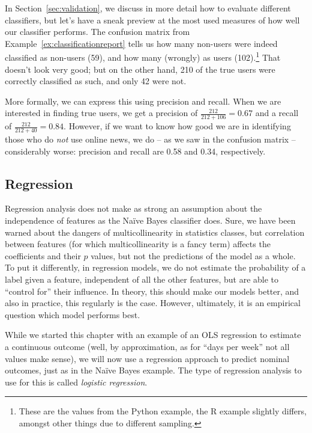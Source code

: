 In Section~\ref{sec:validation}, we discuss in more detail how to
evaluate different classifiers, but let's have a sneak preview at the most used
measures of how well our classifier performs.
The confusion matrix from Example~\ref{ex:classificationreport} tells us how many non-users were indeed
classified as non-users (59), and how many (wrongly) as users
(102).\footnote{These are the values from the Python example, the R
  example slightly differs, amongst other things due to different
  sampling.} That doesn't look very good; but on the other hand, 210
of the true users were correctly classified as such, and only 42 were
not.

More formally, we can express this using precision and recall. When we
are interested in finding true users, we get a precision of $\frac{212}{212+106} = 0.67$
 and a recall of $\frac{212}{212+40} = 0.84$.
However, if we want to know how good we are in identifying those who
do \emph{not} use online news, we do -- as we saw in the confusion
matrix -- considerably worse: precision and recall are 0.58 and 0.34,
respectively.



\subsection{Regression} \label{subsec:regression}

Regression analysis does not make as strong an assumption about the
independence of features as the Na\"ive Bayes classifier does.  Sure,
we have been warned about the dangers of multicollinearity in
statistics classes, but correlation between features (for which
multicollinearity is a fancy term) affects the coefficients and their
$p$ values, but not the predictions of the model as a whole.   To put
it differently, in regression models, we do not estimate the
probability of a label given a feature, independent of all the other
features, but are able to ``control for'' their influence.  In theory,
this should make our models better, and also in practice, this
regularly is the case. However, ultimately, it is an empirical
question which model performs best.

While we started this chapter with an example of an OLS regression to
estimate a continuous outcome (well, by approximation, as for ``days
per week'' not all values make sense), we will now use a regression
approach to predict nominal outcomes, just as in the Na\"ive Bayes
example.  The type of regression analysis to use for this is called
\emph{logistic regression}.

